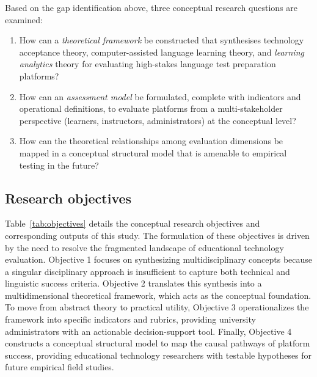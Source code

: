 \documentclass[11pt,a4paper]{article}
\begin{document}
Based on the gap identification above, three conceptual research questions are examined:
\begin{enumerate}
  \item How can a \textit{theoretical framework} be constructed that synthesises technology acceptance theory, computer-assisted language learning theory, and \textit{learning analytics} theory for evaluating high-stakes language test preparation platforms?
  \item How can an \textit{assessment model} be formulated, complete with indicators and operational definitions, to evaluate platforms from a multi-stakeholder perspective (learners, instructors, administrators) at the conceptual level?
  \item How can the theoretical relationships among evaluation dimensions be mapped in a conceptual structural model that is amenable to empirical testing in the future?
\end{enumerate}

\subsection{Research objectives}

Table~\ref{tab:objectives} details the conceptual research objectives and corresponding outputs of this study. The formulation of these objectives is driven by the need to resolve the fragmented landscape of educational technology evaluation. Objective 1 focuses on synthesizing multidisciplinary concepts because a singular disciplinary approach is insufficient to capture both technical and linguistic success criteria. Objective 2 translates this synthesis into a multidimensional theoretical framework, which acts as the conceptual foundation. To move from abstract theory to practical utility, Objective 3 operationalizes the framework into specific indicators and rubrics, providing university administrators with an actionable decision-support tool. Finally, Objective 4 constructs a conceptual structural model to map the causal pathways of platform success, providing educational technology researchers with testable hypotheses for future empirical field studies.
\end{document}

